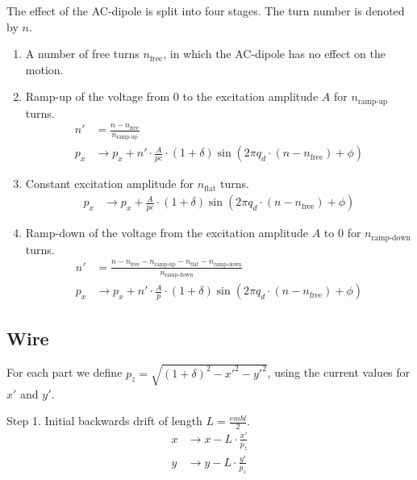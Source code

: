 The effect of the AC-dipole is split into four stages. The turn number is denoted by $n$.
\begin{enumerate}
  \item A number of free turns $n_{\text{free}}$, in which the AC-dipole has no effect on the motion.
  \item Ramp-up of the voltage from $0$ to the excitation amplitude $A$ for $n_{\text{ramp-up}}$ turns.
        \begin{align*}
            n' &= \frac{n-n_{\text{free}}}{n_{\text{ramp-up}}} \\
            p_x &\to p_x + n' \cdot \frac{A}{pc} \cdot(1+\delta) \sin\left(2\pi q_d\cdot(n-n_{\text{free}})+\phi\right)
        \end{align*}
  \item Constant excitation amplitude for $n_{\text{flat}}$ turns.
        \begin{align*}
            p_x &\to p_x + \frac{A}{pc}\cdot(1+\delta)\sin\left(2\pi q_d\cdot(n-n_{\text{free}})+\phi\right)
        \end{align*}
  \item Ramp-down of the voltage from the excitation amplitude $A$ to $0$ for $n_{\text{ramp-down}}$ turns.
        \begin{align*}
            n' &= \frac{n-n_{\text{free}}-n_{\text{ramp-up}}-n_{\text{flat}}-n_{\text{ramp-down}}}{n_{\text{ramp-down}}} \\
            p_x &\to p_x + n' \cdot \frac{A}{p} \cdot(1+\delta) \sin\left(2\pi q_d\cdot(n-n_{\text{free}})+\phi\right)
        \end{align*}
\end{enumerate}

\subsection{Wire}
For each part we define $p_z=\sqrt{(1+\delta)^2-x'^2-y'^2}$, using the current values for $x'$ and $y'$.

Step 1. Initial backwards drift of length $L=\frac{embl}{2}$.
\begin{align*}
	x &\to x - L\cdot\frac{x'}{p_z} \\
    y &\to y - L\cdot\frac{y'}{p_z}
\end{align*}


